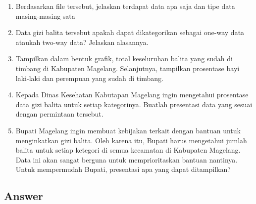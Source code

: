 \documentclass[12pt,titlepage]{article}
\begin{document}
\begin{enumerate}
    \item Berdasarkan file tersebut, jelaskan terdapat data apa saja dan tipe data masing-masing sata
    \item Data gizi balita tersebut apakah dapat dikategorikan sebagai one-way data ataukah two-way data? Jelaskan alasannya. 
    \item Tampilkan dalam bentuk grafik, total keseluruhan balita yang sudah di timbang di Kabupaten Magelang. Selanjutnya, tampilkan prosentase bayi laki-laki dan perempuan yang sudah di timbang. 
    \item Kepada Dinas Kesehatan Kabutapan Magelang ingin mengetahui prosentase data gizi balita untuk setiap kategorinya. Buatlah presentasi data yang sesuai dengan permintaan tersebut. 
    \item Bupati Magelang ingin membuat kebijakan terkait dengan bantuan untuk menginkatkan gizi balita. Oleh karena itu, Bupati harus mengetahui jumlah balita untuk setiap ketegori di semua kecamatan di Kabupaten Magelang. Data ini akan sangat berguna untuk memprioritaskan bantuan nantinya. Untuk mempermudah Bupati, presentasi apa yang dapat ditampilkan?
\end{enumerate}

\subsection*{Answer}
\end{document}
